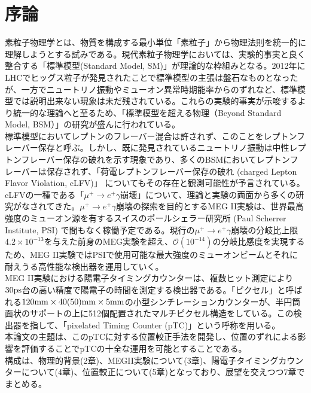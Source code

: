 \documentclass[Yonemoto_master.tex]{subfiles}
\begin{document}
\chapter{序論}

素粒子物理学とは、物質を構成する最小単位「素粒子」から物理法則を統一的に理解しようとする試みである。現代素粒子物理学においては、実験的事実と良く整合する「標準模型(Standard Model, SM)」が理論的な枠組みとなる。2012年にLHCでヒッグス粒子が発見されたことで標準模型の主張は盤石なものとなったが、一方でニュートリノ振動やミューオン異常時期能率からのずれなど、標準模型では説明出来ない現象は未だ残されている。これらの実験的事実が示唆するより統一的な理論へと至るため、「標準模型を超える物理（Beyond Standard Model, BSM）」の研究が盛んに行われている。\\

標準模型においてレプトンのフレーバー混合は許されず、このことをレプトンフレーバー保存と呼ぶ。しかし、既に発見されているニュートリノ振動は中性レプトンフレーバー保存の破れを示す現象であり、多くのBSMにおいてレプトンフレーバーは保存されず、「荷電レプトンフレーバー保存の破れ (charged Lepton Flavor Violation, cLFV)」 についてもその存在と観測可能性が予言されている。\\


cLFVの一種である「$\mu^+ \to e^+\gamma$崩壊」について、理論と実験の両面から多くの研究がなされてきた。$\mu^+ \to e^+\gamma$崩壊の探索を目的とするMEG II実験\cite{MEGII}は、世界最高強度のミューオン源を有するスイスのポールシェラー研究所 (Paul Scherrer Institute, PSI) で間もなく稼働予定である。現行の$\mu^+ \to e^+\gamma$崩壊の分岐比上限$4.2 \times 10^{-13}$を与えた前身のMEG実験\cite{MEG}を超え、$\mathcal{O}(10^{-14})$の分岐比感度を実現するため、MEG II実験ではPSIで使用可能な最大強度のミューオンビームとそれに耐えうる高性能な検出器を運用していく。\\


MEG II実験における陽電子タイミングカウンターは、複数ヒット測定により$ 30 \rm ps$台の高い精度で陽電子の時間を測定する検出器である。「ピクセル」と呼ばれる$120 {\rm mm} \times 40 (50){\rm mm} \times 5 {\rm mm}$の小型シンチレーションカウンターが、半円筒面状のサポートの上に512個配置されたマルチピクセル構造をしている。この検出器を指して、「pixelated Timing Counter (pTC)」という呼称を用いる。\\

本論文の主題は、このpTCに対する位置較正手法を開発し、位置のずれによる影響を評価することでpTCの十全な運用を可能とすることである。\\

構成は、物理的背景(2章)、MEGII実験について(3章)、陽電子タイミングカウンターについて(4章)、位置較正について(5章)となっており、展望を交えつつ7章でまとめる。
\end{document}
